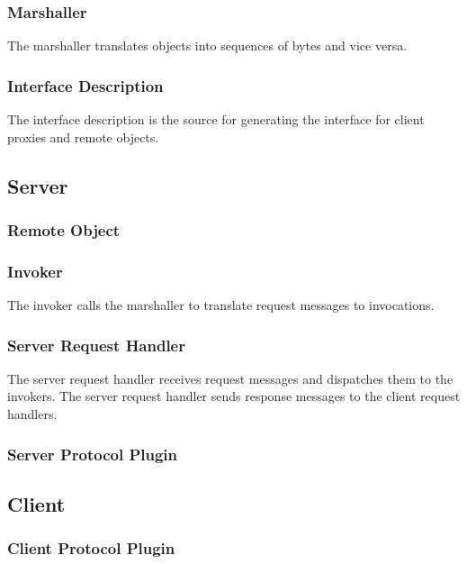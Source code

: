 \documentclass[a4paper]{article}
\begin{document}
\subsubsection{Marshaller}

The marshaller translates objects into sequences of bytes and vice versa.

\subsubsection{Interface Description}

The interface description is the source for generating the interface for client proxies and remote objects.

\subsection{Server}

\subsubsection{Remote Object}

\subsubsection{Invoker}

The invoker calls the marshaller to translate request messages to invocations.

\subsubsection{Server Request Handler}

The server request handler receives request messages and dispatches them to the invokers.
The server request handler sends response messages to the client request handlers.

\subsubsection{Server Protocol Plugin}

\subsection{Client}

\subsubsection{Client Protocol Plugin}
\end{document}
